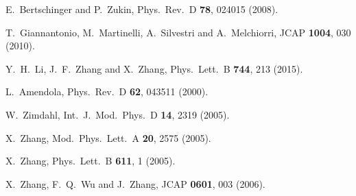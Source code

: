 \documentclass[aps,prd,nofootinbib,amsmath,amssymb,twocolumn,superscriptaddress,10pt]{revtex4}%
\begin{document}
\begin{thebibliography}{}
  E.~Bertschinger and P.~Zukin,
  Phys.\ Rev.\ D {\bf 78}, 024015 (2008).

  T.~Giannantonio, M.~Martinelli, A.~Silvestri and A.~Melchiorri,
  JCAP {\bf 1004}, 030 (2010).

  Y.~H.~Li, J.~F.~Zhang and X.~Zhang,
  Phys.\ Lett.\ B {\bf 744}, 213 (2015).


  L.~Amendola,
  Phys.\ Rev.\ D {\bf 62}, 043511 (2000).


  W.~Zimdahl,
  Int.\ J.\ Mod.\ Phys.\ D {\bf 14}, 2319 (2005).


  X.~Zhang,
  Mod.\ Phys.\ Lett.\ A {\bf 20}, 2575 (2005).

  X.~Zhang,
  Phys.\ Lett.\ B {\bf 611}, 1 (2005).


  X.~Zhang, F.~Q.~Wu and J.~Zhang,
  JCAP {\bf 0601}, 003 (2006).






\end{thebibliography}
\end{document}
